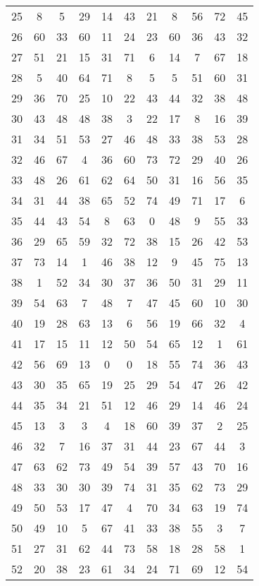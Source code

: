 \begin{table}
\begin{tabular}{c c c c c c c c c c c }
25 & 8 & 5 & 29 & 14 & 43 & 21 & 8 & 56 & 72 & 45 \\
26 & 60 & 33 & 60 & 11 & 24 & 23 & 60 & 36 & 43 & 32 \\
27 & 51 & 21 & 15 & 31 & 71 & 6 & 14 & 7 & 67 & 18 \\
28 & 5 & 40 & 64 & 71 & 8 & 5 & 5 & 51 & 60 & 31 \\
29 & 36 & 70 & 25 & 10 & 22 & 43 & 44 & 32 & 38 & 48 \\
30 & 43 & 48 & 48 & 38 & 3 & 22 & 17 & 8 & 16 & 39 \\
31 & 34 & 51 & 53 & 27 & 46 & 48 & 33 & 38 & 53 & 28 \\
32 & 46 & 67 & 4 & 36 & 60 & 73 & 72 & 29 & 40 & 26 \\
33 & 48 & 26 & 61 & 62 & 64 & 50 & 31 & 16 & 56 & 35 \\
34 & 31 & 44 & 38 & 65 & 52 & 74 & 49 & 71 & 17 & 6 \\
35 & 44 & 43 & 54 & 8 & 63 & 0 & 48 & 9 & 55 & 33 \\
36 & 29 & 65 & 59 & 32 & 72 & 38 & 15 & 26 & 42 & 53 \\
37 & 73 & 14 & 1 & 46 & 38 & 12 & 9 & 45 & 75 & 13 \\
38 & 1 & 52 & 34 & 30 & 37 & 36 & 50 & 31 & 29 & 11 \\
39 & 54 & 63 & 7 & 48 & 7 & 47 & 45 & 60 & 10 & 30 \\
40 & 19 & 28 & 63 & 13 & 6 & 56 & 19 & 66 & 32 & 4 \\
41 & 17 & 15 & 11 & 12 & 50 & 54 & 65 & 12 & 1 & 61 \\
42 & 56 & 69 & 13 & 0 & 0 & 18 & 55 & 74 & 36 & 43 \\
43 & 30 & 35 & 65 & 19 & 25 & 29 & 54 & 47 & 26 & 42 \\
44 & 35 & 34 & 21 & 51 & 12 & 46 & 29 & 14 & 46 & 24 \\
45 & 13 & 3 & 3 & 4 & 18 & 60 & 39 & 37 & 2 & 25 \\
46 & 32 & 7 & 16 & 37 & 31 & 44 & 23 & 67 & 44 & 3 \\
47 & 63 & 62 & 73 & 49 & 54 & 39 & 57 & 43 & 70 & 16 \\
48 & 33 & 30 & 30 & 39 & 74 & 31 & 35 & 62 & 73 & 29 \\
49 & 50 & 53 & 17 & 47 & 4 & 70 & 34 & 63 & 19 & 74 \\
50 & 49 & 10 & 5 & 67 & 41 & 33 & 38 & 55 & 3 & 7 \\
51 & 27 & 31 & 62 & 44 & 73 & 58 & 18 & 28 & 58 & 1 \\
52 & 20 & 38 & 23 & 61 & 34 & 24 & 71 & 69 & 12 & 54 \\

\end{tabular}
\end{table}
